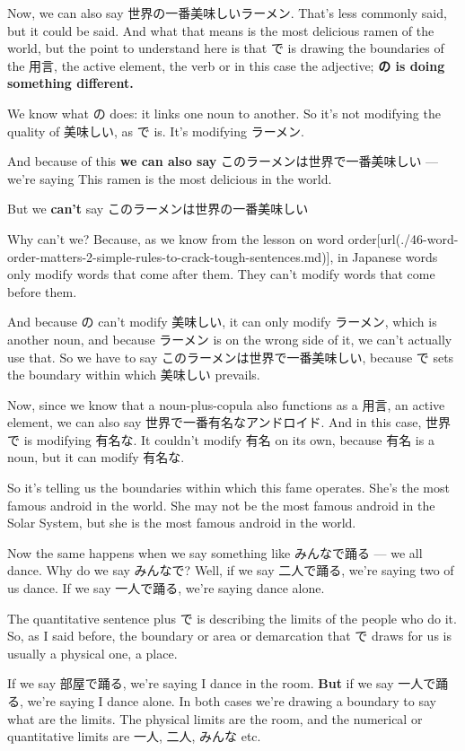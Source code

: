 \thinrule

Now, we can also say 世界の一番美味しいラーメン. That's less commonly said, but it could be said. And what that means is the most delicious ramen of the world, but the point to understand here is that で is drawing the boundaries of the 用言, the active element, the verb or in this case the adjective; {\bf の is doing something different.}

We know what の does: it links one noun to another. So it's not modifying the quality of 美味しい, as で is. It's modifying ラーメン.

\thinrule

And because of this {\bf we can also say} このラーメンは世界で一番美味しい --- we're saying This ramen is the most delicious in the world.

But we {\bf can't} say このラーメンは世界の一番美味しい

{}

Why can't we? Because, as we know from the lesson on word order\goto{{[}46{]}}[url(./46-word-order-matters-2-simple-rules-to-crack-tough-sentences.md)], in Japanese words only modify words that come after them. They can't modify words that come before them.

And because の can't modify 美味しい, it can only modify ラーメン, which is another noun, and because ラーメン is on the wrong side of it, we can't actually use that. So we have to say このラーメンは世界で一番美味しい, because で sets the boundary within which 美味しい prevails.

\thinrule

Now, since we know that a noun-plus-copula also functions as a 用言, an active element, we can also say 世界で一番有名なアンドロイド. And in this case, 世界で is modifying 有名な. It couldn't modify 有名 on its own, because 有名 is a noun, but it can modify 有名な.

So it's telling us the boundaries within which this fame operates. She's the most famous android in the world. She may not be the most famous android in the Solar System, but she is the most famous android in the world.

Now the same happens when we say something like みんなで踊る --- we all dance. Why do we say みんなで? Well, if we say 二人で踊る, we're saying two of us dance. If we say 一人で踊る, we're saying dance alone.

The quantitative sentence plus で is describing the limits of the people who do it. So, as I said before, the boundary or area or demarcation that で draws for us is usually a physical one, a place.

If we say 部屋で踊る, we're saying I dance in the room. {\bf But} if we say 一人で踊る, we're saying I dance alone. In both cases we're drawing a boundary to say what are the limits. The physical limits are the room, and the numerical or quantitative limits are 一人, 二人, みんな etc.

\stopsectionlevel

\stopsectionlevel
